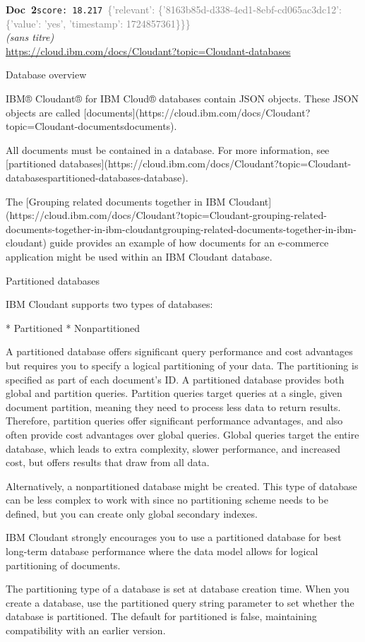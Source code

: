 \documentclass[a4paper,11pt]{article}
\begin{document}
\begin{docenv}
{\footnotesize\textcolor{doccolor}{\textbf{Doc~2}}}\hfill{\tiny\texttt{score:~18.217}}\ {\tiny\textcolor{gray}{\{'relevant': \{'8163b85d-d338-4ed1-8ebf-cd065ac3dc12': \{'value': 'yes', 'timestamp': 1724857361\}\}\}}}\\[3pt]
{\small\textit{(sans titre)}}\\[2pt]
{\tiny\url{https://cloud.ibm.com/docs/Cloudant?topic=Cloudant-databases}}\\[4pt]
{\footnotesize 
Database overview 

IBM® Cloudant® for IBM Cloud® databases contain JSON objects. These JSON objects are called [documents](https://cloud.ibm.com/docs/Cloudant?topic=Cloudant-documentsdocuments).

All documents must be contained in a database. For more information, see [partitioned databases](https://cloud.ibm.com/docs/Cloudant?topic=Cloudant-databasespartitioned-databases-database).

The [Grouping related documents together in IBM Cloudant](https://cloud.ibm.com/docs/Cloudant?topic=Cloudant-grouping-related-documents-together-in-ibm-cloudantgrouping-related-documents-together-in-ibm-cloudant) guide provides an example of how documents for an e-commerce application might be used within an IBM Cloudant database.



 Partitioned databases 

IBM Cloudant supports two types of databases:



* Partitioned
* Nonpartitioned



A partitioned database offers significant query performance and cost advantages but requires you to specify a logical partitioning of your data. The partitioning is specified as part of each document's ID. A partitioned database provides both global and partition queries. Partition queries target queries at a single, given document partition, meaning they need to process less data to return results. Therefore, partition queries offer significant performance advantages, and also often provide cost advantages over global queries. Global queries target the entire database, which leads to extra complexity, slower performance, and increased cost, but offers results that draw from all data.

Alternatively, a nonpartitioned database might be created. This type of database can be less complex to work with since no partitioning scheme needs to be defined, but you can create only global secondary indexes.

IBM Cloudant strongly encourages you to use a partitioned database for best long-term database performance where the data model allows for logical partitioning of documents.

The partitioning type of a database is set at database creation time. When you create a database, use the partitioned query string parameter to set whether the database is partitioned. The default for partitioned is false, maintaining compatibility with an earlier version.}
\end{docenv}
\end{document}
